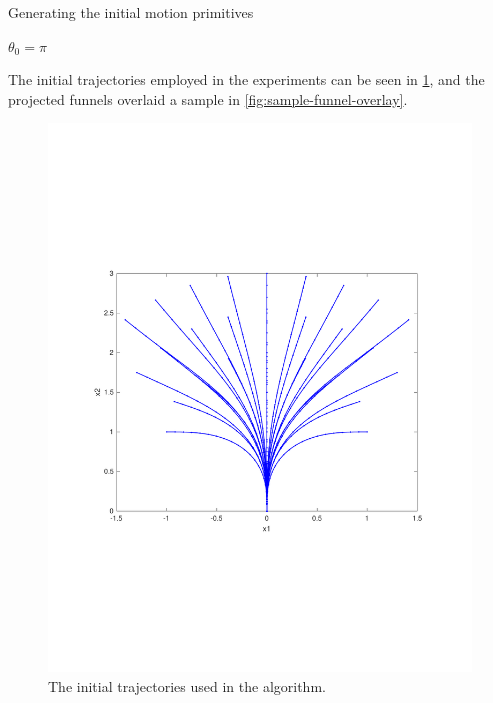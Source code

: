 \begin{algorithm}
  \caption{Generating the initial motion primitives}
  \label{alg:initial-motion-primitives-generation}
  \DontPrintSemicolon \SetAlgoNoLine

   

  \(\theta_{0} = \pi\) \;

  \;
\end{algorithm}

The initial trajectories employed in the experiments can be seen in
\cref{fig:intial-trajectories-exp}, and the projected funnels overlaid a sample
in \cref{fig:sample-funnel-overlay}.

\begin{figure}
  \centering \includegraphics[scale=.5, trim={0cm 7cm 0cm
    7cm}]{figures/experiments/initial-trajectories}
  \caption{The initial trajectories used in the \rrtfunnel{} algorithm.}
  \label{fig:intial-trajectories-exp}
\end{figure}

